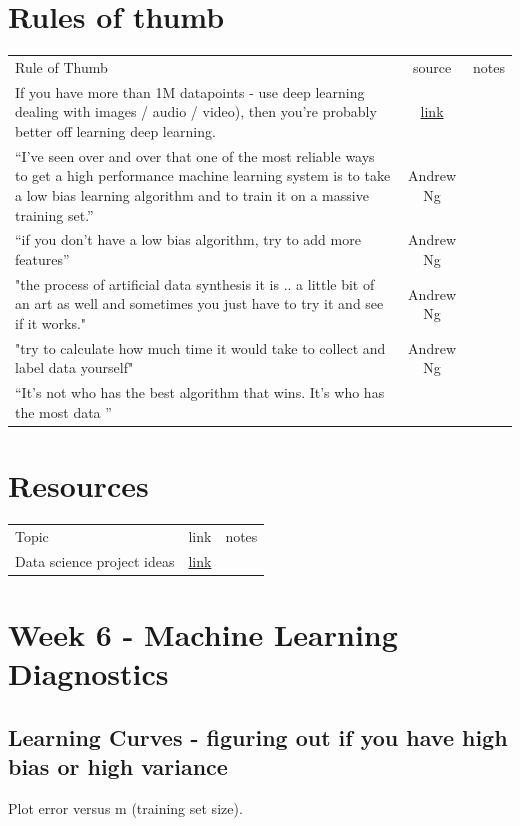 \documentclass[fontsize=11]{article}
\begin{document}
\section{Rules of thumb}

\begin{tabularx}{\linewidth}{X c c}
Rule of Thumb & source & notes \\
If you have more than 1M datapoints - use deep learning
dealing with images / audio / video), then you’re probably better off learning deep learning. & \href{https://www.quora.com/Should-a-machine-learning-beginner-go-straight-for-deep-learning}{link} & \\
``I've seen over and over that
 one of the most reliable ways to
 get a high performance machine learning
 system is to take
 a low bias learning algorithm
 and to train it on a massive training set.'' & Andrew Ng & \\
 ``if you don't have a low bias algorithm, try to add more features'' & Andrew Ng & \\
 "the process of artificial
 data synthesis it is .. a little bit of
 an art as well and sometimes
 you just have to try it and see if it works." & Andrew Ng & \\
  "try to calculate how much time it would take to collect and label data yourself" & Andrew Ng & \\
 ``It's not who has the best algorithm that wins. It's who has the most data '' & & \\
 
\end{tabularx}

\section{Resources}

\begin{tabularx}{\linewidth}{X|c|c}
Topic & link & notes \\
Data science project ideas & \href{https://www.quora.com/What-are-some-really-interesting-machine-learning-projects-for-beginners}{link} & \\
\end{tabularx}

\section{Week 6 - Machine Learning Diagnostics}

\subsection{Learning Curves - figuring out if you have high bias or high variance}
Plot error versus m (training set size). 
\end{document}
